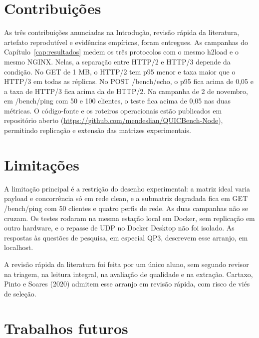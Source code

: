 \section{Contribuições}

As três contribuições anunciadas na Introdução, revisão rápida da literatura, artefato reprodutível e evidências empíricas, foram entregues. As campanhas do Capítulo~\ref{cap:resultados} medem os três protocolos com o mesmo h2load e o mesmo NGINX. Nelas, a separação entre HTTP/2 e HTTP/3 depende da condição. No GET de 1 MB, o HTTP/2 tem p95 menor e taxa maior que o HTTP/3 em todas as réplicas. No POST /bench/echo, o p95 fica acima de 0,05 e a taxa de HTTP/3 fica acima da de HTTP/2. Na campanha de 2 de novembro, em /bench/ping com 50 e 100 clientes, o teste fica acima de 0,05 nas duas métricas. O código-fonte e os roteiros operacionais estão publicados em repositório aberto (\url{https://github.com/mendeslian/QUICBench-Node}), permitindo replicação e extensão das matrizes experimentais.

\section{Limitações}

A limitação principal é a restrição do desenho experimental: a matriz ideal varia payload e concorrência só em rede clean, e a submatriz degradada fica em GET /bench/ping com 50 clientes e quatro perfis de rede. As duas campanhas não se cruzam. Os testes rodaram na mesma estação local em Docker, sem replicação em outro hardware, e o repasse de UDP no Docker Desktop não foi isolado. As respostas às questões de pesquisa, em especial QP3, descrevem esse arranjo, em localhost.

A revisão rápida da literatura foi feita por um único aluno, sem segundo revisor na triagem, na leitura integral, na avaliação de qualidade e na extração. Cartaxo, Pinto e Soares (2020) admitem esse arranjo em revisão rápida, com risco de viés de seleção.

\section{Trabalhos futuros}

